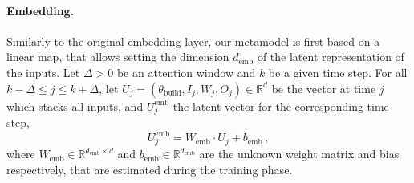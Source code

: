\documentclass[12pt]{article}
\newcommand{\eqsp}{\,}
\begin{document}
\paragraph{Embedding.}
Similarly to the original embedding layer,  our metamodel is first based on a linear map, that allows setting the dimension $d_{\mathrm{emb}}$ of the latent representation of the inputs.
Let $\Delta >0$ be an  attention window and $k$ be a given time step. For all $k-\Delta \leqslant j\leqslant k+\Delta$, let $U_j = (\theta_{\mathrm{build}}, I_j, W_j, O_j)\in\mathbb{R}^d$ be the vector at time $j$ which stacks all inputs, and $U^{\mathrm{emb}}_j$ the latent vector for the corresponding time step,
$$
    U^{\mathrm{emb}}_j = W_{\mathrm{emb}} \cdot U_j + b_{\mathrm{emb}}\eqsp,
$$
where $W_{\mathrm{emb}}\in\mathbb{R}^{d_{\mathrm{emb}}\times d}$ and $b_{\mathrm{emb}}\in\mathbb{R}^{d_{\mathrm{emb}}}$ are the unknown weight matrix and bias respectively, that are estimated during the training phase.
\end{document}
